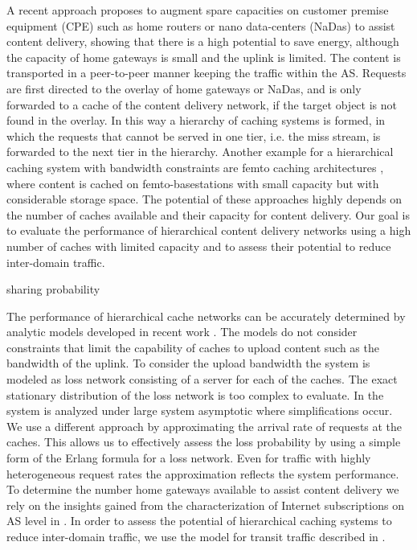 A recent approach \cite{valancius2009greening} proposes to augment spare capacities on customer premise equipment (CPE) such as home routers or nano data-centers (NaDas) to assist content delivery, showing that there is a high potential to save energy, although the capacity of home gateways is small and the uplink is limited.
The content is transported in a peer-to-peer manner keeping the traffic within the AS.
Requests are first directed to the overlay of home gateways or NaDas, and is only forwarded to a cache of the content delivery network, if the target object is not found in the overlay.
In this way a hierarchy of caching systems is formed, in which the requests that cannot be served in one tier, i.e. the miss stream, is forwarded to the next tier in the hierarchy.
Another example for a hierarchical caching system with bandwidth constraints are femto caching architectures \cite{golrezaei2013femtocaching}, where content is cached on femto-basestations with small capacity but with considerable storage space.
The potential of these approaches highly depends on the number of caches available and their capacity for content delivery.
Our goal is to evaluate the performance of hierarchical content delivery networks using a high number of caches with limited capacity and to assess their potential to reduce inter-domain traffic.

sharing probability


The performance of hierarchical cache networks can be accurately determined by analytic models developed in recent work \cite{che2002hierarchical, martina2014unified}.
The models do not consider constraints that limit the capability of caches to upload content such as the bandwidth of the uplink.
To consider the upload bandwidth the system is modeled as loss network consisting of a server for each of the caches. The exact stationary distribution of the loss network is too complex to evaluate.
In \cite{tan2013optimal} the system is analyzed under large system asymptotic where simplifications occur.
We use a different approach by approximating the arrival rate of requests at the caches.
This allows us to effectively assess the loss probability by using a simple form of the Erlang formula for a loss network.
Even for traffic with highly heterogeneous request rates the approximation reflects the system performance.
To determine the number home gateways available to assist content delivery we rely on the insights gained from the characterization of Internet subscriptions on AS level in .
 In order to assess the potential of hierarchical caching systems to reduce inter-domain traffic, we use the model for transit traffic described in .

